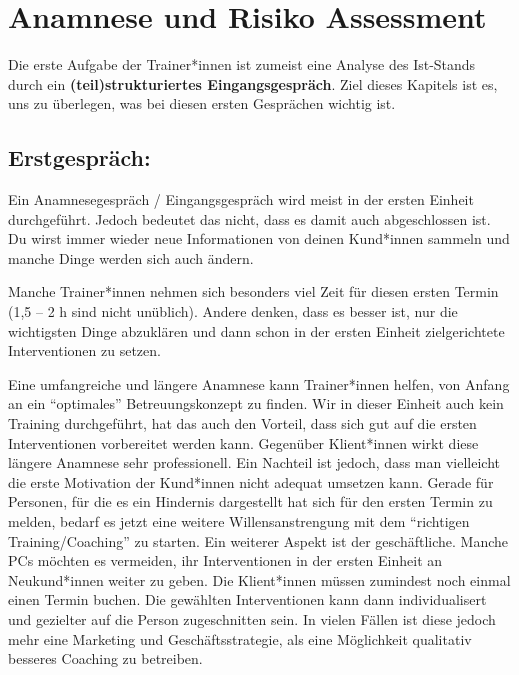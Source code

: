 \documentclass[
  letterpaper,
  DIV=11,
  numbers=noendperiod]{scrreprt}
\begin{document}

\chapter{Anamnese und Risiko Assessment}\label{sec-anamnese-risk}

Die erste Aufgabe der Trainer*innen ist zumeist eine Analyse des
Ist-Stands durch ein \textbf{(teil)strukturiertes Eingangsgespräch}.
Ziel dieses Kapitels ist es, uns zu überlegen, was bei diesen ersten
Gesprächen wichtig ist.

\section{Erstgespräch:}\label{sec-erstgespraech}

Ein Anamnesegespräch / Eingangsgespräch wird meist in der ersten Einheit
durchgeführt. Jedoch bedeutet das nicht, dass es damit auch
abgeschlossen ist. Du wirst immer wieder neue Informationen von deinen
Kund*innen sammeln und manche Dinge werden sich auch ändern.

Manche Trainer*innen nehmen sich besonders viel Zeit für diesen ersten
Termin (1,5 -- 2 h sind nicht unüblich). Andere denken, dass es besser
ist, nur die wichtigsten Dinge abzuklären und dann schon in der ersten
Einheit zielgerichtete Interventionen zu setzen.

Eine umfangreiche und längere Anamnese kann Trainer*innen helfen, von
Anfang an ein ``optimales'' Betreuungskonzept zu finden. Wir in dieser
Einheit auch kein Training durchgeführt, hat das auch den Vorteil, dass
sich gut auf die ersten Interventionen vorbereitet werden kann.
Gegenüber Klient*innen wirkt diese längere Anamnese sehr professionell.
Ein Nachteil ist jedoch, dass man vielleicht die erste Motivation der
Kund*innen nicht adequat umsetzen kann. Gerade für Personen, für die es
ein Hindernis dargestellt hat sich für den ersten Termin zu melden,
bedarf es jetzt eine weitere Willensanstrengung mit dem ``richtigen
Training/Coaching'' zu starten. Ein weiterer Aspekt ist der
geschäftliche. Manche PCs möchten es vermeiden, ihr Interventionen in
der ersten Einheit an Neukund*innen weiter zu geben. Die Klient*innen
müssen zumindest noch einmal einen Termin buchen. Die gewählten
Interventionen kann dann individualisert und gezielter auf die Person
zugeschnitten sein. In vielen Fällen ist diese jedoch mehr eine
Marketing und Geschäftsstrategie, als eine Möglichkeit qualitativ
besseres Coaching zu betreiben.
\end{document}
